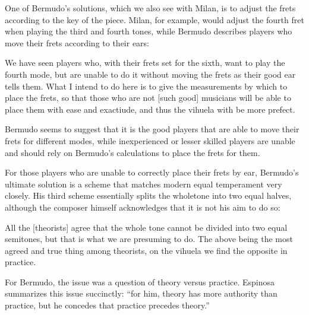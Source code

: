One of Bermudo's solutions, which we also see with Milan, is to adjust the frets
according to the key of the piece.  Milan, for example, would adjust the fourth fret
when playing the third and fourth tones, while Bermudo describes players who move their
frets according to their ears:
\begin{blocks}
We have seen players who, with their frets set for the sixth, want to play the fourth
mode, but are unable to do it without moving the frets as their good ear tells them.
What I intend to do here is to give the measurements by which to place the frets, so
that those who are not [such good] musicians will be able to place them with ease and
exactiude, and thus the vihuela with be more prefect.
\autocite[78]{DE:1}
\end{blocks}
Bermudo seems to suggest that it is the good players that are able to move their frets
for different modes, while inexperienced or lesser skilled players are unable and should
rely on Bermudo's calculations to place the frets for them.

For those players who are unable to correctly place their frets by ear, Bermudo's
ultimate solution is a scheme that matches modern equal temperament very closely.  His
third scheme essentially splits the wholetone into two equal halves, although the
composer himself acknowledges that it is not his aim to do so:
\begin{blocks}
All the [theorists] agree that the whole tone cannot be divided into two equal
semitones, but that is what we are presuming to do.  The above being the most agreed
and true thing among theorists, on the vihuela we find the opposite in practice.
\autocite[xx]{DE:1}
\end{blocks}
For Bermudo, the issue was a question of theory versus practice.  Espinosa summarizes
this issue succinctly: ``for him, theory has more authority than practice, but he
concedes that practice precedes theory.'' \autocite[xx]{DE:1}


